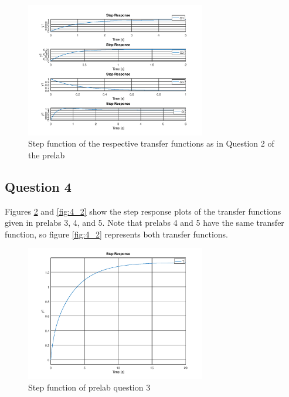 \documentclass[12pt, a4paper]{article}
\begin{document}
		\begin{figure}[H]
			\centering
			\includegraphics[width=0.7\textwidth]{Images/question_2_lab.png}
			\caption{Step function of the respective transfer functions as in Question 2 of the prelab}
			\label{fig:question_2_lab} 
		\end{figure}


		\subsection{Question 4} %
		\label{sub:question_4}
			Figures \ref{fig:4_1} and \ref{fig:4_2} show the step response plots of the transfer functions given in prelabs 3, 4, and 5. Note that prelabs 4 and 5 have the same transfer function, so figure \ref{fig:4_2}	represents both transfer functions.
			\begin{figure}[H]
				\centering
				\includegraphics[width=0.7\textwidth]{Images/question_4_1_lab.png}
				\caption{Step function of prelab question 3}
				\label{fig:4_1} 
			\end{figure}
\end{document}
